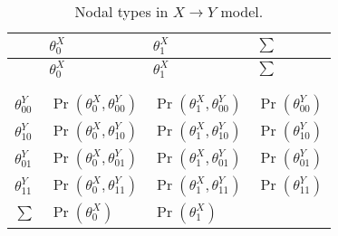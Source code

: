 \documentclass[
  11pt,
  article]{jss}
\begin{document}
\begin{longtable}[]{@{}
  >{\centering\arraybackslash}p{}
  >{\centering\arraybackslash}p{}
  >{\centering\arraybackslash}p{}
  >{\centering\arraybackslash}p{}@{}}
\toprule\noalign{}
\begin{minipage}[b]{\linewidth}\centering
\end{minipage} & \begin{minipage}[b]{\linewidth}\centering
\(\theta^X_{0}\)
\end{minipage} & \begin{minipage}[b]{\linewidth}\centering
\(\theta^X_{1}\)
\end{minipage} & \begin{minipage}[b]{\linewidth}\centering
\(\sum\)
\end{minipage} \\
\midrule\noalign{}
\endfirsthead
\toprule\noalign{}
\begin{minipage}[b]{\linewidth}\centering
\end{minipage} & \begin{minipage}[b]{\linewidth}\centering
\(\theta^X_{0}\)
\end{minipage} & \begin{minipage}[b]{\linewidth}\centering
\(\theta^X_{1}\)
\end{minipage} & \begin{minipage}[b]{\linewidth}\centering
\(\sum\)
\end{minipage} \\
\midrule\noalign{}
\endhead
\bottomrule\noalign{}
\tabularnewline
\caption{Nodal types in \(X \rightarrow Y\)
model.}\label{tbl-joint}\tabularnewline
\endlastfoot
\(\theta^Y_{00}\) & \(\Pr(\theta^X_0, \theta^Y_{00})\) &
\(\Pr(\theta^X_1, \theta^Y_{00})\) & \(\Pr(\theta^Y_{00})\) \\
\(\theta^Y_{10}\) & \(\Pr(\theta^X_0, \theta^Y_{10})\) &
\(\Pr(\theta^X_1, \theta^Y_{10})\) & \(\Pr(\theta^Y_{10})\) \\
\(\theta^Y_{01}\) & \(\Pr(\theta^X_0, \theta^Y_{01})\) &
\(\Pr(\theta^X_1, \theta^Y_{01})\) & \(\Pr(\theta^Y_{01})\) \\
\(\theta^Y_{11}\) & \(\Pr(\theta^X_0, \theta^Y_{11})\) &
\(\Pr(\theta^X_1, \theta^Y_{11})\) & \(\Pr(\theta^Y_{11})\) \\
\(\sum\) & \(\Pr(\theta^X_0)\) & \(\Pr(\theta^X_1)\) & 1 \\
\end{longtable}
\end{document}
